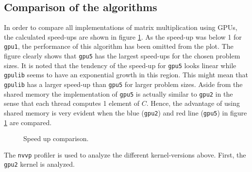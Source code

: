 \subsection{Comparison of the algorithms}
In order to compare all implementations of matrix multiplication using GPUs, the calculated speed-ups are shown in figure \ref{fig:speed_comp}. As the speed-up was below 1 for \texttt{gpu1}, the performance of this algorithm has been omitted from the plot. The figure clearly shows that \texttt{gpu5} has the largest speed-ups for the chosen problem sizes. It is noted that the tendency of the speed-up for \texttt{gpu5} looks linear while \texttt{gpulib} seems to have an exponential growth in this region. This might mean that \texttt{gpulib} has a larger speed-up than \texttt{gpu5} for larger problem sizes. Aside from the shared memory the implementation of \texttt{gpu5} is actually similar to \texttt{gpu2} in the sense that each thread computes 1 element of $C$. Hence, the advantage of using shared memory is very evident when the blue (\texttt{gpu2}) and red line (\texttt{gpu5}) in figure \ref{fig:speed_comp} are compared.

\begin{figure}[H]
\centering
{}
\caption{Speed up comparison.}
\label{fig:speed_comp}
\end{figure}

The \texttt{nvvp} profiler is used to analyze the different kernel-versions above. First, the \texttt{gpu2} kernel is analyzed. 

